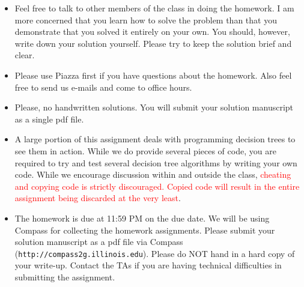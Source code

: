 
\usepackage{graphicx,amssymb,amsmath,url}
\usepackage{color}
\sloppy
\newcommand{\ignore}[1]{}

\oddsidemargin 0in
\evensidemargin 0in
\textwidth 6.5in
\topmargin -0.5in
\textheight 9.0in




\begin{footnotesize}
\begin{itemize}
\item Feel free to talk to other members of the class in doing the homework.  I am
more concerned that you learn how to solve the problem than that you
demonstrate that you solved it entirely on your own.  You should, however,
write down your solution yourself.  Please try to keep the solution brief and
clear.

\item Please use Piazza first if you have questions about the homework.
  Also feel free to send us e-mails and come to office hours.

\item Please, no handwritten solutions. You will submit your solution manuscript as a single pdf file.


\item 
A large portion of this assignment deals with programming decision trees to see them
in action. While we do provide several pieces of code, you are required to try and test
several decision tree algorithms by writing your own code. While we encourage discussion
within and outside the class, \textcolor{red}{cheating and copying code is strictly 
discouraged. Copied code will result in the entire assignment being discarded at the very least}.

\item The homework is due at 11:59 PM on the due date. We will be using
Compass for collecting the homework assignments. Please submit your solution manuscript as a pdf file via Compass 
(\texttt{http://compass2g.illinois.edu}). Please do NOT hand in a hard copy of your write-up.
Contact the TAs if you are having technical difficulties in 
submitting the assignment. 
\end{itemize}
\end{footnotesize}


